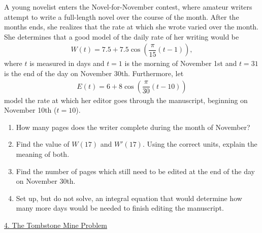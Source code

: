 A young novelist enters the Novel-for-November contest, where amateur writers attempt to write a full-length novel over the course of the month. After the months ends, she realizes that the rate at which she wrote varied over the month. She determines that a good model of the daily rate of her writing would be \begin{align*}
    W(t) = 7.5 + 7.5\cos \left(\dfrac{\pi}{15}(t - 1)\right),
\end{align*}
where $t$ is measured in days and $t = 1$ is the morning of November 1st and $t = 31$ is the end of the day on November 30th. Furthermore, let \begin{align*}
    E(t) = 6 + 8\cos \left(\dfrac{\pi}{30}(t - 10)\right)
\end{align*} 
model the rate at which her editor goes through the manuscript, beginning on November 10th ($t = 10$). \\
\begin{enumerate}[label=\hspace{11pt}(\alph*), align=left, leftmargin=*, labelsep=0.25em]
    \item How many pages does the writer complete during the month of November? 
    \item Find the value of $W(17)$ and $W'(17)$. Using the correct units, explain the meaning of both. 
    \item Find the number of pages which still need to be edited at the end of the day on November 30th. 
    \item Set up, but do not solve, an integral equation that would determine how many more days would be needed to finish editing the manuscript. 
\end{enumerate} \vspace{11pt}

\begin{center}
    \underline{4. The Tombstone Mine Problem}
\end{center}

